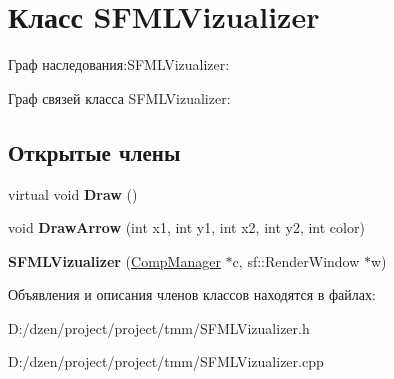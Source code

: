 \hypertarget{class_s_f_m_l_vizualizer}{
\section{Класс SFMLVizualizer}
\label{class_s_f_m_l_vizualizer}
}


Граф наследования:SFMLVizualizer:


Граф связей класса SFMLVizualizer:
\subsection*{Открытые члены}
\begin{DoxyCompactItemize}
\item 
\hypertarget{class_s_f_m_l_vizualizer_ab8d16effe5d3cb2af95039a0fa4fbfc5}{
virtual void {\bfseries Draw} ()}
\label{class_s_f_m_l_vizualizer_ab8d16effe5d3cb2af95039a0fa4fbfc5}

\item 
\hypertarget{class_s_f_m_l_vizualizer_a60859fd813bca3208ebb0035f359c19d}{
void {\bfseries DrawArrow} (int x1, int y1, int x2, int y2, int color)}
\label{class_s_f_m_l_vizualizer_a60859fd813bca3208ebb0035f359c19d}

\item 
\hypertarget{class_s_f_m_l_vizualizer_a7127834cb672593150cf3c22fe17e609}{
{\bfseries SFMLVizualizer} (\hyperlink{class_comp_manager}{CompManager} $\ast$c, sf::RenderWindow $\ast$w)}
\label{class_s_f_m_l_vizualizer_a7127834cb672593150cf3c22fe17e609}

\end{DoxyCompactItemize}


Объявления и описания членов классов находятся в файлах:\begin{DoxyCompactItemize}
\item 
D:/dzen/project/project/tmm/SFMLVizualizer.h\item 
D:/dzen/project/project/tmm/SFMLVizualizer.cpp\end{DoxyCompactItemize}
